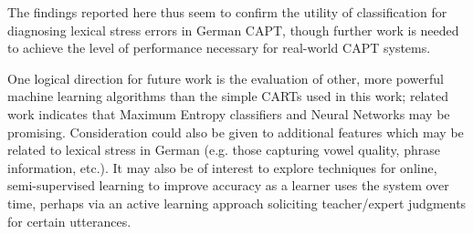 \documentclass[a4paper]{article}
\begin{document}
		The findings reported here thus seem to confirm the utility of classification for diagnosing lexical stress errors in German CAPT, though further work is needed to achieve the level of performance necessary for real-world CAPT systems.
	

	One logical direction for future work is the evaluation of other, more powerful machine learning algorithms than the simple CARTs used in this work; related work indicates that Maximum Entropy classifiers \cite{Kim2011} and Neural Networks \cite{Shahin2012a} may be promising. 
	Consideration could also be given to additional features which may be related to lexical stress in German (e.g. 
	{\color{blue}those capturing vowel quality, phrase information, etc.). }
	{\color{blue} 
	It may also be of interest to explore techniques for online, semi-supervised learning 
	to improve accuracy 
	as a learner uses the system over time, perhaps via an active learning approach soliciting teacher/expert judgments for certain utterances.  
	}
\end{document}

